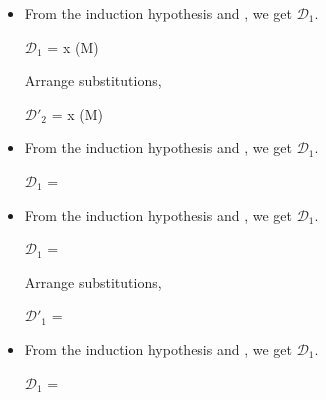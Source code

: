 \begin{itemize}
	\item \QEta
	      	      	      	      
	      From the induction hypothesis and \QEta, we get $\mathcal{D}_1$.
	      	      	      	      
	      $\mathcal{D}_1$ = 
	      { \andalso x \notin \FV(M\SB)}
	      	      	      	      
	      Arrange substitutions,
	      	      	      	      
	      $\mathcal{D}'_2$ = 
	      { \andalso x \notin \FV(M\SB)}
	      	      	      	      
	\item \QTBLTB
	      	      	      	      
	      From the induction hypothesis and \QTBLTB, we get $\mathcal{D}_1$.
	      	      	      	      
	      $\mathcal{D}_1$ = 
	      {}
	      	      	      	      
	\item \QLambda
	      	      	      	      
	      From the induction hypothesis and \QLambda, we get $\mathcal{D}_1$.
	      	      	      	      
	      $\mathcal{D}_1$ = 
	      {}
	      	      	      	      
	      Arrange substitutions,
	      	      	      	      
	      $\mathcal{D}'_1$ = 
	      {}
	      	      	      	      
	      	      	      	      
	\item \QPercent
	      	      	      	      
	      From the induction hypothesis and \QPercent, we get $\mathcal{D}_1$.
	      	      	      	      
	      $\mathcal{D}_1$ = 
	      { \andalso {} }
	      	      	      	      
\end{itemize}
\fi

